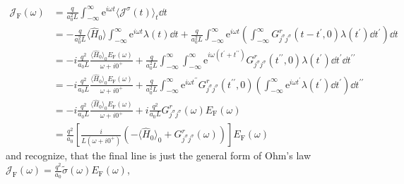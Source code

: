 \begin{align}
    \mathcal{J}_{\text{F} }(\omega ) & = \frac{q}{a_0^2 L} \int_{-\infty}^{\infty }  \mathrm{e}^{i \omega t} \langle \mathcal{J}^{\sigma }(t) \rangle_t \dd{t} \nonumber                                                                                                            \\
                                     & = - \frac{q}{a_0^2 L}\langle \hat{H} _0 \rangle  \int_{-\infty}^{\infty }  \mathrm{e}^{i \omega t} \lambda (t)\dd{t} 
    + \frac{q}{a_0^2 L} \int_{-\infty }^{\infty } \mathrm{e}^{i \omega t}  \left(\int_{-\infty }^{\infty }G^r_{j^{\sigma }j^{\sigma}}(t-t^{\prime},0 ) \lambda (t^{\prime} )\dd{t^{\prime} }\right) \dd{t}  \nonumber                                                                    \\
                                     & = -i \frac{q^2}{a_0 L} \frac{\langle \hat{H} _0 \rangle_0 E_{\text{F} }(\omega )}{\omega + i 0^{+}  }
    + \frac{q}{a_0^2 L} \int_{-\infty }^{\infty }  \int_{-\infty }^{\infty }  \mathrm{e}^{i \omega (t^{\prime} + t^{\prime\prime}) } G^r_{j^{\sigma }j^{\sigma}}(t^{\prime\prime},0 ) \lambda (t^{\prime} ) \dd{t^{\prime} } \dd{t^{\prime\prime} }   \nonumber                     \\
                                     & = -i \frac{q^2}{a_0 L} \frac{\langle \hat{H} _0 \rangle_0 E_{\text{F} }(\omega )}{\omega + i 0^{+}  }
    + \frac{q}{a_0^2 L} \int_{-\infty }^{\infty } \mathrm{e}^{i \omega  t^{\prime\prime} } G^r_{j^{\sigma }j^{\sigma}}(t^{\prime\prime},0 ) \left(\int_{-\infty }^{\infty } \mathrm{e}^{i \omega t^{\prime} } \lambda (t^{\prime} )\dd{t^{\prime} }\right)\dd{t^{\prime\prime} }   \nonumber \\
                                     & = -i \frac{q^2}{a_0 L} \frac{\langle \hat{H} _0 \rangle_0 E_{\text{F} }(\omega )}{\omega + i 0^{+}  }
    + i\frac{q^2}{a_0 L} G^r_{j^{\sigma }j^{\sigma}}(\omega) E_{\text{F} }(\omega ) \nonumber                                                                                                                                                                                               \\
                                     & = \frac{q^2}{a_0} \left[\frac{i}{L(\omega +i 0^{+} )} \left(- \langle \hat{H} _0 \rangle_0 + G^r_{j^{\sigma }j^{\sigma }}(\omega ) \right)  \right] E_{\text{F} }(\omega )
\end{align}
and recognize, that the final line is just the general form of Ohm's law \(\mathcal{J}_{\text{F} }(\omega ) = \frac{q^2}{a_0}\tilde{\sigma}(\omega)E_{\text{F} }(\omega )\),
